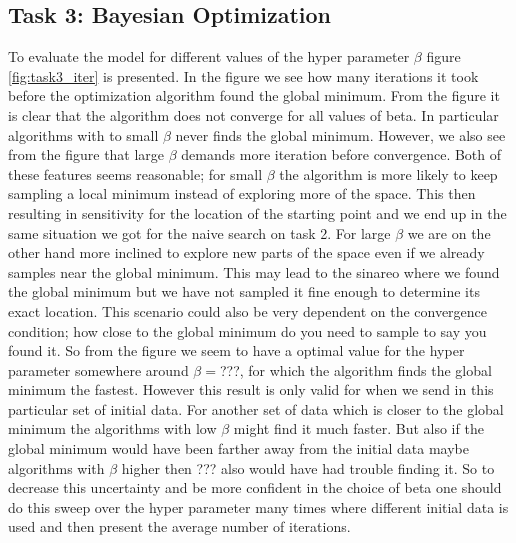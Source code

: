 \documentclass[11pt,a4paper]{article}
\begin{document}
\subsection[Task 1]{Task 3: Bayesian Optimization}
\label{sec:results_task3}
To evaluate the model for different values of the hyper parameter $\beta$ figure \ref{fig:task3_iter} is presented. In the figure we see how many iterations it took before the optimization algorithm found the global minimum. From the figure it is clear that the algorithm does not converge for all values of beta. In particular algorithms with to small $\beta$ never finds the global minimum. However, we also see from the figure that large $\beta$ demands more iteration before convergence. Both of these features seems reasonable; for small $\beta$ the algorithm is more likely to keep sampling a local minimum instead of exploring more of the space. This then resulting in sensitivity for the location of the starting point and we end up in the same situation we got for the naive search on task 2. For large $\beta$ we are on the other hand more inclined to explore new parts of the space even if we already samples near the global minimum. This may lead to the sinareo where we found the global minimum but we have not sampled it fine enough to determine its exact location. This scenario could also be very dependent on the convergence condition; how close to the global minimum do you need to sample to say you found it. So from the figure we seem to have a optimal value for the hyper parameter somewhere around $\beta = $???, for which the algorithm finds the global minimum the fastest. However this result is only valid for when we send in this particular set of initial data. For another set of data which is closer to the global minimum the algorithms with low $\beta$ might find it much faster. But also if the global minimum would have been farther away from the initial data maybe algorithms with $\beta$ higher then ??? also would have had trouble finding it. So to decrease this uncertainty and be more confident in the choice of beta one should do this sweep over the hyper parameter many times where different initial data is used and then present the average number of iterations.
\end{document}
